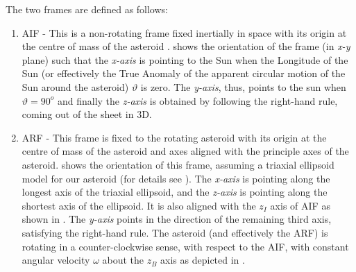 \FloatBarrier
The two frames are defined as follows:
\begin{enumerate}
\item \gls{AIF} - This is a non-rotating frame fixed inertially in space with its origin at the centre of mass of the asteroid .  shows the orientation of the frame (in \emph{x-y} plane) such that the \emph{x-axis} is pointing to the Sun when the Longitude of the Sun (or effectively the True Anomaly of the apparent circular motion of the Sun around the asteroid) $\vartheta$ is zero. The \emph{y-axis}, thus, points to the sun when $\vartheta = 90^o$ and finally the \emph{z-axis} is obtained by following the right-hand rule, coming out of the sheet in 3D.
%
\item \gls{ARF} - This frame is fixed to the rotating asteroid with its origin at the centre of mass of the asteroid and axes aligned with the principle axes of the asteroid.  shows the orientation of this frame, assuming a triaxial ellipsoid model for our asteroid (for details see ). The \emph{x-axis} is pointing along the longest axis of the triaxial ellipsoid, and the \emph{z-axis} is pointing along the shortest axis of the ellipsoid. It is also aligned with the $z_I$ axis of \gls{AIF} as shown in . The \emph{y-axis} points in the direction of the remaining third axis, satisfying the right-hand rule. The asteroid (and effectively the \gls{ARF}) is rotating in a counter-clockwise sense, with respect to the \gls{AIF}, with constant angular velocity $\omega$ about the $z_B$ axis as depicted in .
\end{enumerate}
